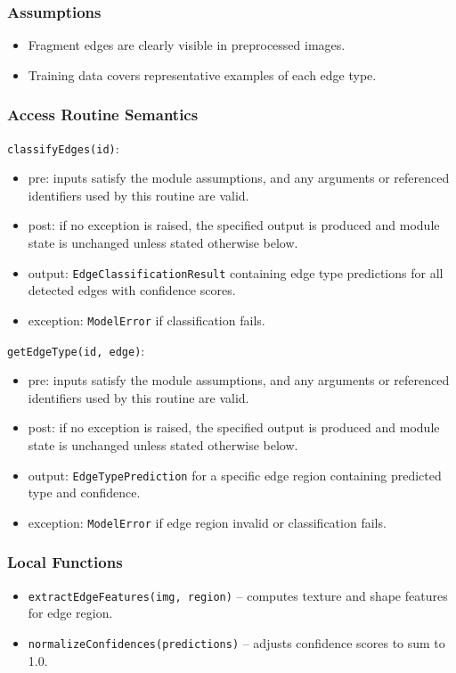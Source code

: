 \documentclass[12pt, titlepage]{article}
\begin{document}
\subsubsection{Assumptions}
\begin{itemize}
    \item Fragment edges are clearly visible in preprocessed images.
    \item Training data covers representative examples of each edge type.
\end{itemize}

\subsubsection{Access Routine Semantics}

\noindent \texttt{classifyEdges(id)}:
\begin{itemize}
    \item pre: inputs satisfy the module assumptions, and any arguments or referenced identifiers used by this routine are valid.
    \item post: if no exception is raised, the specified output is produced and module state is unchanged unless stated otherwise below.
    \item output: \texttt{EdgeClassificationResult} containing edge type predictions for all detected edges with confidence scores.
    \item exception: \texttt{ModelError} if classification fails.
\end{itemize}

\noindent \texttt{getEdgeType(id, edge)}:
\begin{itemize}
    \item pre: inputs satisfy the module assumptions, and any arguments or referenced identifiers used by this routine are valid.
    \item post: if no exception is raised, the specified output is produced and module state is unchanged unless stated otherwise below.
    \item output: \texttt{EdgeTypePrediction} for a specific edge region containing predicted type and confidence.
    \item exception: \texttt{ModelError} if edge region invalid or classification fails.
\end{itemize}

\subsubsection{Local Functions}
\begin{itemize}
    \item \texttt{extractEdgeFeatures(img, region)} – computes texture and shape features for edge region.
    \item \texttt{normalizeConfidences(predictions)} – adjusts confidence scores to sum to 1.0.
\end{itemize}
\end{document}
